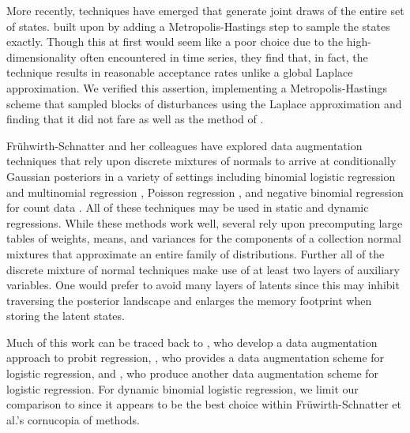 \documentclass[12pt]{article}
\begin{document}
More recently, techniques have emerged that generate joint draws of the entire
set of states.  \cite{ravines-etal-2006} built upon \cite{west-etal-1985} by
adding a Metropolis-Hastings step to sample the states exactly.  Though this at
first would seem like a poor choice due to the high-dimensionality often
encountered in time series, they find that, in fact, the technique results in
reasonable acceptance rates unlike a global Laplace approximation.  We verified
this assertion, implementing a Metropolis-Hastings scheme that sampled blocks of
disturbances using the Laplace approximation and finding that it did not fare as
well as the method of \cite{ravines-etal-2006}.

Fr\"{u}hwirth-Schnatter and her colleagues have explored data augmentation
techniques that rely upon discrete mixtures of normals to arrive at
conditionally Gaussian posteriors in a variety of settings including binomial
logistic regression and multinomial regression
\citep{fruhwirth-schnatter-fruhwirth-2007, fruhwirth-schnatter-fruhwirth-2010,
  fussl-etal-2013}, Poisson regression \citep{fruhwirth-schnatter-wagner-2006,
  fruhwirth-schnatter-etal-2009}, and negative binomial regression for count
data \citep{fruhwirth-schnatter-etal-2009}.  All of these techniques may be used
in static and dynamic regressions.  While these methods work well, several rely
upon precomputing large tables of weights, means, and variances for the
components of a collection normal mixtures that approximate an entire family of
distributions.  Further all of the discrete mixture of normal techniques make
use of at least two layers of auxiliary variables.  One would prefer to avoid
many layers of latents since this may inhibit traversing the posterior landscape
and enlarges the memory footprint when storing the latent states.

Much of this work can be traced back to \cite{albert-chib-1993}, who develop a
data augmentation approach to probit regression, \cite{mcfadden-1974}, who
provides a data augmentation scheme for logistic regression, and
\cite{holmes-held-2006}, who produce another data augmentation scheme for
logistic regression.  For dynamic binomial logistic regression, we limit our
comparison to \cite{fussl-etal-2013} since it appears to be the best choice
within Fr\"{u}wirth-Schnatter et al.'s cornucopia of methods.
\end{document}
